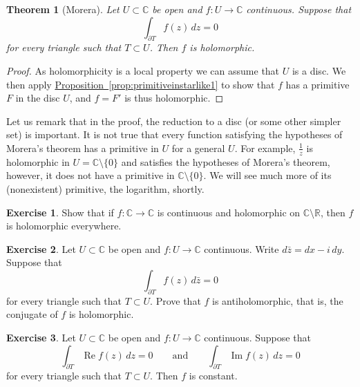 \documentclass[12pt,openany]{book}
\renewcommand{\Re}{\operatorname{Re}}
\renewcommand{\Im}{\operatorname{Im}}
\newcommand{\C}{{\mathbb{C}}}
\newcommand{\R}{{\mathbb{R}}}
\theoremstyle{plain}
\newtheorem{thm}{Theorem}[section]
\theoremstyle{remark}
\theoremstyle{definition}
\newenvironment{exbox}{%
    \def\FrameCommand{\vrule width 1pt \relax\hspace{10pt}}%
    \MakeFramed{\advance\hsize-\width\FrameRestore}%
}{%
    \endMakeFramed
}
\theoremstyle{exercise}
\newtheorem{exercise}{Exercise}[section]
\theoremstyle{example}
\newcommand{\propref}[1]{\hyperref[#1]{Proposition~\ref*{#1}}}
\begin{document}
\begin{thm}[Morera]
%
\label{thm:Morera}%
Let $U \subset \C$ be open and $f \colon U \to \C$ continuous.
Suppose that
\begin{equation*}
\int_{\partial T} f(z) \, dz = 0
\end{equation*}
for every triangle such that $T \subset U$.  Then $f$ is holomorphic.
\end{thm}

\begin{proof}
As holomorphicity is a local property we can assume that $U$ is a disc.
We then apply \propref{prop:primitiveinstarlike1} to show that $f$ has
a primitive $F$ in the disc $U$, and $f = F'$ is thus holomorphic.
\end{proof}

Let us remark that in the proof,
the reduction to a disc (or some other simpler set)
is important.  It is not true
that every function satisfying the hypotheses of Morera's theorem has a
primitive in $U$ for a general $U$.  For example, $\frac{1}{z}$ is
holomorphic in $U = \C \setminus \{ 0 \}$ and satisfies the hypotheses of
Morera's theorem, however, it does not have a primitive
in $\C \setminus \{ 0 \}$.  We will see much
more of its (nonexistent) primitive, the logarithm, shortly.

\begin{exbox}
\begin{exercise}
Show that if $f \colon \C \to \C$ is continuous and holomorphic on $\C
\setminus \R$, then $f$ is holomorphic everywhere.
\end{exercise}

\begin{exercise}
Let $U \subset \C$ be open and $f \colon U \to \C$ continuous.
Write $d\bar{z} = dx - i \, dy$.
Suppose that
\begin{equation*}
\int_{\partial T} f(z) \, d\bar{z} = 0
\end{equation*}
for every triangle such that $T \subset U$.  Prove that $f$
is antiholomorphic, that is, the conjugate of $f$ is holomorphic.
\end{exercise}

\begin{exercise}
Let $U \subset \C$ be open and $f \colon U \to \C$ continuous.
Suppose that
\begin{equation*}
\int_{\partial T} \Re f(z) \, dz = 0
\qquad \text{and} \qquad
\int_{\partial T} \Im f(z) \, dz = 0
\end{equation*}
for every triangle such that $T \subset U$.  Then $f$ is constant.
\end{exercise}
\end{exbox}
\end{document}

